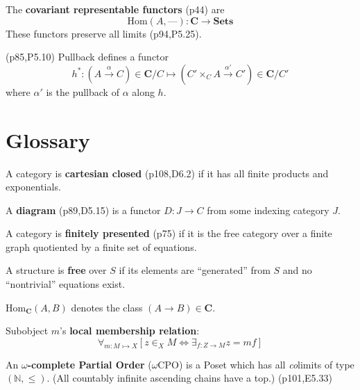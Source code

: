 \documentclass[10pt,twocolumn,letterpaper]{article}
\newcommand{\brak}[1]{\left[{#1}\right]}
\newcommand{\defn}[1]{{\bf #1}}
\begin{document}
  The \defn{covariant representable functors} (p44) are
     \[\mbox{Hom}(A,\text{---}) : \mathbf{C} \to \mathbf{Sets}\]
  These functors preserve all limits (p94,P5.25).

  (p85,P5.10) Pullback defines a functor
    \[ h^* : (A \stackrel{\alpha}{\to} C) \in \mathbf{C}/C
       \mapsto (C' \times_C A \stackrel{\alpha'}{\to} C') \in \mathbf{C}/C' \]
    where $\alpha'$ is the pullback of $\alpha$ along $h$.

\section{Glossary}

  A category is \defn{cartesian closed} (p108,D6.2) if it has all finite
  products and exponentials.

  A \defn{diagram} (p89,D5.15) is a functor $D : J \to C$ from
     some indexing category $J$.

  A category is \defn{finitely presented} (p75) if it is the
  free category over a finite graph quotiented by a finite set of equations.

  A structure is \defn{free} over $S$ if its elements are ``generated''
  from $S$ and no ``nontrivial'' equations exist.

  $\mbox{Hom}_\mathbf{C}(A,B)$ denotes the class $(A \to B) \in \mathbf{C}$.

  Subobject $m$'s \defn{local membership relation}:
          \[ \forall_{m : M \rightarrowtail X}
             \brak{ z \in_X M \Leftrightarrow \exists_{f:Z \to M} z = mf} \]

  An \defn{$\omega$-complete Partial Order} ($\omega$CPO) is a Poset which
    has all {\em co}limits of type $(\mathbb{N},\le)$.  (All countably
    infinite ascending chains have a top.) (p101,E5.33)
\end{document}
